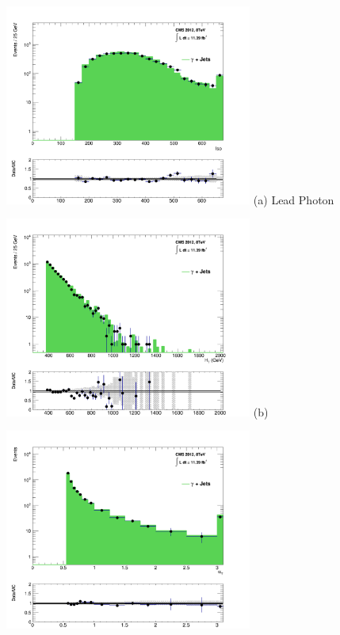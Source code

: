 \begin{itemize}
\begin{itemize}
\end{itemize}

\begin{figure}[ht]
\centering
\begin{minipage}{.48\textwidth}
\centering
\includegraphics[width = 3.2in]{plots/photon_leadphoton_datamc.pdf}
(a) Lead Photon \pt
\end{minipage}
\begin{minipage}{.48\textwidth}
\centering
\includegraphics[width = 3.2in]{plots/photon_ht_datamc.pdf}
(b) \theht
\end{minipage}
\begin{minipage}{.48\textwidth}
\centering
\includegraphics[width = 3.2in]{plots/photon_alphat_datamc.pdf}

\end{minipage}
\end{figure}
\end{itemize}
